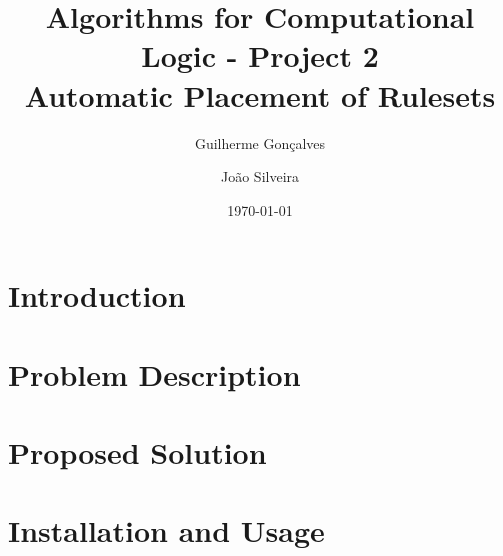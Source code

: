 \documentclass[a4paper, 11pt]{article}
\title{Algorithms for Computational Logic - Project 2 \\ \textbf{Automatic Placement of Rulesets}}
\author{Guilherme Gonçalves \and João Silveira}
\date{\today}
\begin{document}
\maketitle

\clearpage
\tableofcontents
\clearpage

\section{Introduction}


\section{Problem Description}


\section{Proposed Solution}


\section{Installation and Usage}



% 
\end{document}
